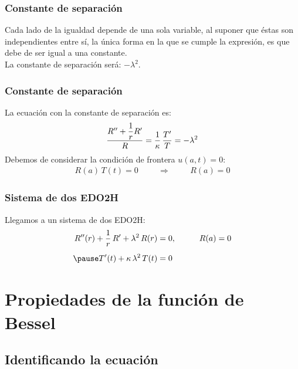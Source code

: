 \documentclass[12pt]{beamer}
\begin{document}
\begin{frame}
\frametitle{Constante de separación}
Cada lado de la igualdad depende de una sola variable, al suponer que éstas son independientes entre sí, la única forma en la que se cumple la expresión, es que debe de ser igual a una constante.
\pause
\\
\bigskip
La constante de separación será: $-\lambda^{2}$.
\end{frame}
\begin{frame}
\frametitle{Constante de separación}
La ecuación con la constante de separación es:
\pause
\begin{align*}
\dfrac{{R}^{\prime \prime} + \dfrac{1}{r} {R}^{\prime}}{R} = \dfrac{1}{\kappa} \, \dfrac{{T}^{\prime}}{T} = -\lambda^{2}
\end{align*}
\pause
Debemos de considerar la condición de frontera $u(a, t) = 0$:
\pause
\begin{align*}
R(a) \, T(t) = 0 \hspace{1cm} \Rightarrow \hspace{1cm} R(a) = 0
\end{align*}
\end{frame}
\begin{frame}
\frametitle{Sistema de dos EDO2H}
Llegamos a un sistema de dos EDO2H:
\pause
\begin{eqnarray}
\begin{aligned}
\sderivada{R}(r) + \dfrac{1}{r} \, \pderivada{R} + \lambda^{2} \, R(r) &= 0, \hspace{1cm} R(a) = 0 \label{eq:ecuacion_CilBessel_03} \\[0.5em] \pause 
\pderivada{T}(t) + \kappa \, \lambda^{2} \, T(t) &= 0 \label{eq:ecuacion_CilBessel_04}
\end{aligned}
\end{eqnarray}
\end{frame}

\section{Propiedades de la función de Bessel}
\subsection{Identificando la ecuación}
\end{document}
